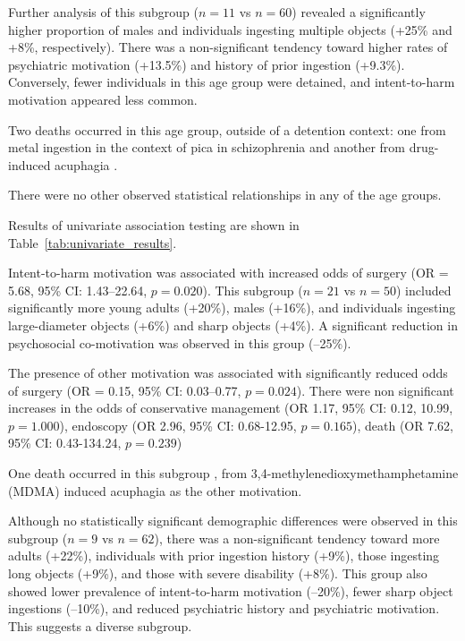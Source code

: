 \documentclass[pdflatex,sn-basic,Numbered]{sn-jnl}
\begin{document}
Further analysis of this subgroup ($n = 11$ vs $n = 60$) revealed a significantly higher proportion of males and individuals ingesting multiple objects (+25\% and +8\%, respectively). There was a non-significant tendency toward higher rates of psychiatric motivation (+13.5\%) and history of prior ingestion (+9.3\%). Conversely, fewer individuals in this age group were detained, and intent-to-harm motivation appeared less common. 

Two deaths occurred in this age group, outside of a detention context: one from metal ingestion in the context of pica in schizophrenia \cite{Kumar_2001} and another from drug-induced acuphagia \cite{Emamhadi_2018}. 

There were no other observed statistical relationships in any of the age groups. 

Results of univariate association testing are shown in Table~\ref{tab:univariate_results}.



Intent-to-harm motivation was associated with increased odds of surgery (OR = 5.68, 95\% CI: 1.43--22.64, $p = 0.020$). This subgroup ($n = 21$ vs $n = 50$) included significantly more young adults (+20\%), males (+16\%), and individuals ingesting large-diameter objects (+6\%) and sharp objects (+4\%). A significant reduction in psychosocial co-motivation was observed in this group (–25\%).

The presence of other motivation was associated with significantly reduced odds of surgery (OR = 0.15, 95\% CI: 0.03--0.77, $p = 0.024$). There were non significant increases in the odds of conservative management (OR 1.17, 95\% CI: 0.12, 10.99, $p = 1.000$), endoscopy (OR 2.96, 95\% CI: 0.68-12.95, $p = 0.165$), death (OR 7.62, 95\% CI: 0.43-134.24, $p =0.239$)

One death occurred in this subgroup \cite{Emamhadi_2018}, from 3,4-methylenedioxymethamphetamine (MDMA) induced acuphagia as the other motivation.

Although no statistically significant demographic differences were observed in this subgroup ($n = 9$ vs $n = 62$), there was a non-significant tendency toward more adults (+22\%), individuals with prior ingestion history (+9\%), those ingesting long objects (+9\%), and those with severe disability (+8\%). This group also showed lower prevalence of intent-to-harm motivation (–20\%), fewer sharp object ingestions (–10\%), and reduced psychiatric history and psychiatric motivation. This suggests a diverse subgroup.
\end{document}
